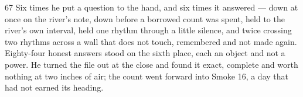 \begin{CRchronicle}{67}
Six times he put a question to the hand, and six times it answered --- down at once on the river’s note, down before a borrowed count was spent, held to the river’s own interval, held one rhythm through a little silence, and twice crossing two rhythms across a wall that does not touch, remembered and not made again. Eighty-four honest answers stood on the sixth place, each an object and not a power. He turned the file out at the close and found it exact, complete and worth nothing at two inches of air; the count went forward into Smoke 16, a day that had not earned its heading.
\end{CRchronicle}
